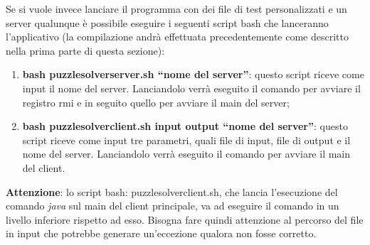 	Se si vuole invece lanciare il programma con dei file di test personalizzati e un server qualunque è possibile eseguire i seguenti script bash che lanceranno l'applicativo (la compilazione andrà effettuata precedentemente come descritto nella prima parte di questa sezione):
	\begin{enumerate}
		\item \textbf{bash puzzlesolverserver.sh ``nome del server''}: questo script riceve come input il nome del server. Lanciandolo verrà eseguito il comando per avviare il registro rmi e in seguito quello per avviare il main del server;
		\item \textbf{bash puzzlesolverclient.sh input output ``nome del server''}: questo script riceve come input tre parametri, quali file di input, file di output e il nome del server. Lanciandolo verrà eseguito il comando per avviare il main del client.
	\end{enumerate}
	\noindent
	\textbf{Attenzione}: lo script bash: puzzlesolverclient.sh, che lancia l'esecuzione del comando \emph{java} sul main del client principale, va ad eseguire il comando in un livello inferiore rispetto ad esso. Bisogna fare quindi attenzione al percorso del file in input che potrebbe generare un'eccezione qualora non fosse corretto.


